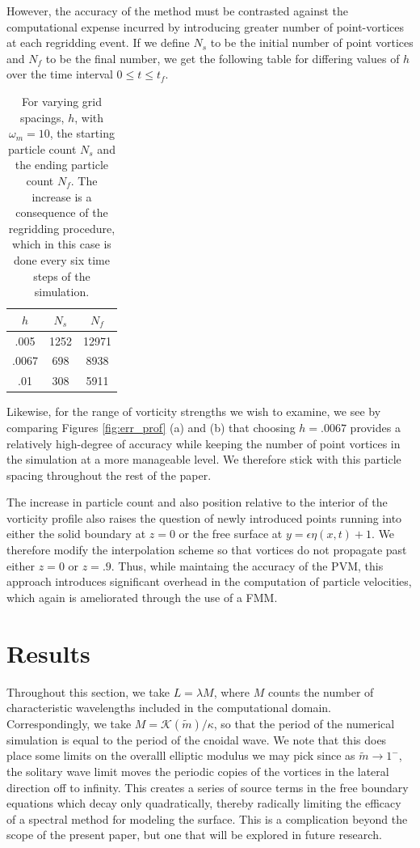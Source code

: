\documentclass[a4paper,11pt]{article}
\begin{document}
However, the accuracy of the method must be contrasted against the computational expense incurred by introducing greater number of point-vortices at each regridding event.  If we define $N_{s}$ to be the initial number of point vortices and $N_{f}$ to be the final number, we get the following table for differing values of $h$ over the time interval $0\leq t \leq t_{f}$.
\begin{table}
\centering
\begin{tabular}{c|cc}
$h$ & $N_{s}$ & $N_{f}$\\
\hline
.005 & 1252 & 12971\\
.0067 & 698 & 8938\\
.01 & 308 & 5911
\end{tabular}
\caption{For varying grid spacings, $h$, with $\omega_{m}=10$, the starting particle count $N_{s}$ and the ending particle count $N_{f}$.  The increase is a consequence of the regridding procedure, which in this case is done every six time steps of the simulation.  }
\end{table}
Likewise, for the range of vorticity strengths we wish to examine, we see by comparing Figures \ref{fig:err_prof} (a) and (b) that choosing $h=.0067$  provides a relatively high-degree of accuracy while keeping the number of point vortices in the simulation at a more manageable level.  We therefore stick with this particle spacing throughout the rest of the paper.  

The increase in particle count and also position relative to the interior of the vorticity profile also raises the question of newly introduced points running into either the solid boundary at $z=0$ or the free surface at $y=\epsilon\eta(x,t)+1$.  We therefore modify the interpolation scheme so that vortices do not propagate past either $z=0$ or $z=.9$.    Thus, while maintaing the accuracy of the PVM, this approach introduces significant overhead in the computation of particle velocities, which again is ameliorated through the use of a FMM.  

\section{Results}
Throughout this section, we take $L = \lambda M$, where $M$ counts the number of characteristic wavelengths included in the computational domain.   Correspondingly, we take $M=\mathcal{K}(\tilde{m})/\kappa$, so that the period of the numerical simulation is equal to the period of the cnoidal wave.   We note that this does place some limits on the overalll elliptic modulus we may pick since as $\tilde{m}\rightarrow 1^{-}$, the solitary wave limit moves the periodic copies of the vortices in the lateral direction off to infinity.  This creates a series of source terms in the free boundary equations which decay only quadratically, thereby radically limiting the efficacy of a spectral method for modeling the surface.  This is a complication beyond the scope of the present paper, but one that will be explored in future research.  
\end{document}
